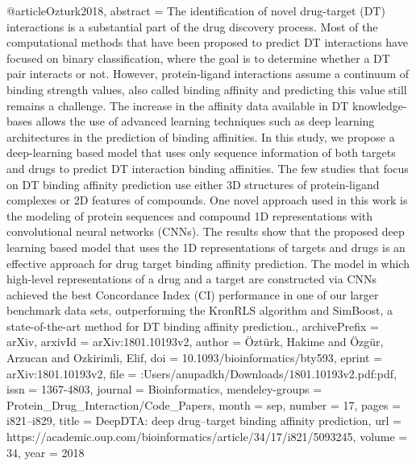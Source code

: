 @article{Ozturk2018,
abstract = {The identification of novel drug-target (DT) interactions is a substantial part of the drug discovery process. Most of the computational methods that have been proposed to predict DT interactions have focused on binary classification, where the goal is to determine whether a DT pair interacts or not. However, protein-ligand interactions assume a continuum of binding strength values, also called binding affinity and predicting this value still remains a challenge. The increase in the affinity data available in DT knowledge-bases allows the use of advanced learning techniques such as deep learning architectures in the prediction of binding affinities. In this study, we propose a deep-learning based model that uses only sequence information of both targets and drugs to predict DT interaction binding affinities. The few studies that focus on DT binding affinity prediction use either 3D structures of protein-ligand complexes or 2D features of compounds. One novel approach used in this work is the modeling of protein sequences and compound 1D representations with convolutional neural networks (CNNs). The results show that the proposed deep learning based model that uses the 1D representations of targets and drugs is an effective approach for drug target binding affinity prediction. The model in which high-level representations of a drug and a target are constructed via CNNs achieved the best Concordance Index (CI) performance in one of our larger benchmark data sets, outperforming the KronRLS algorithm and SimBoost, a state-of-the-art method for DT binding affinity prediction.},
archivePrefix = {arXiv},
arxivId = {arXiv:1801.10193v2},
author = {{\"{O}}zt{\"{u}}rk, Hakime and {\"{O}}zg{\"{u}}r, Arzucan and Ozkirimli, Elif},
doi = {10.1093/bioinformatics/bty593},
eprint = {arXiv:1801.10193v2},
file = {:Users/anupadkh/Downloads/1801.10193v2.pdf:pdf},
issn = {1367-4803},
journal = {Bioinformatics},
mendeley-groups = {Protein{\_}Drug{\_}Interaction/Code{\_}Papers},
month = {sep},
number = {17},
pages = {i821--i829},
title = {{DeepDTA: deep drug–target binding affinity prediction}},
url = {https://academic.oup.com/bioinformatics/article/34/17/i821/5093245},
volume = {34},
year = {2018}
}

